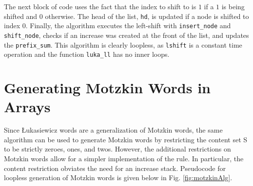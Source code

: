 The next block of code uses the fact that the index to shift to is $1$ if a $1$ is being shifted and $0$ otherwise.  The head of the list, \verb$hd$, is updated if a node is shifted to index 0.  Finally, the algorithm executes the left-shift with \verb$insert_node$ and \verb$shift_node$, checks if an increase was created at the front of the list, and updates the \verb$prefix_sum$.  This algorithm is clearly loopless, as \verb$lshift$ is a constant time operation and the function \verb$luka_ll$ has no inner loops.

\section{Generating Motzkin Words in Arrays}\label{sec:coolMotz}
Since Łukasiewicz words are a generalization of Motzkin words, the same algorithm can be used to generate Motzkin words by restricting the content set S to be strictly zeroes, ones, and twos.  However, the additional restrictions on Motzkin words allow for a simpler implementation of the rule.  In particular, the content restriction obviates the need for an increase stack.   Pseudocode for loopless generation of Motzkin words is given below in Fig. \ref{fig:motzkinAlg}. 


